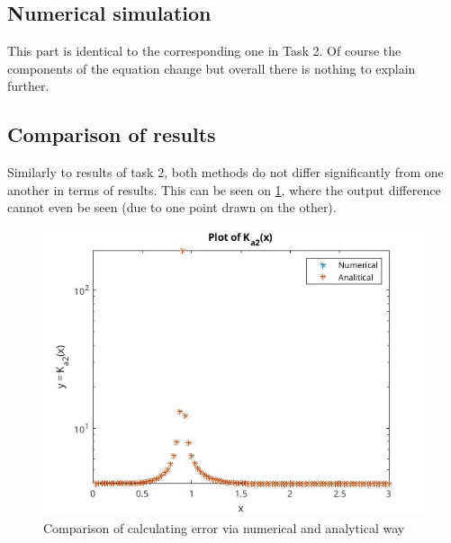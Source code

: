 \subsection{Numerical simulation}
This part is identical to the corresponding one in Task 2. Of course the
components of the equation change but overall there is nothing to explain
further.

\subsection{Comparison of results}
Similarly to results of task 2, both methods do not differ significantly from
one another in terms of results. This can be seen on \ref{fig:task3}, where the
output difference cannot even be seen (due to one point drawn on the other).

\begin{figure}[ht]
    \begin{center}
        \includegraphics[width=\textwidth]{Task3.jpg}
    \end{center}
    \caption{Comparison of calculating error via numerical and analytical way}
    \label{fig:task3}
\end{figure}
